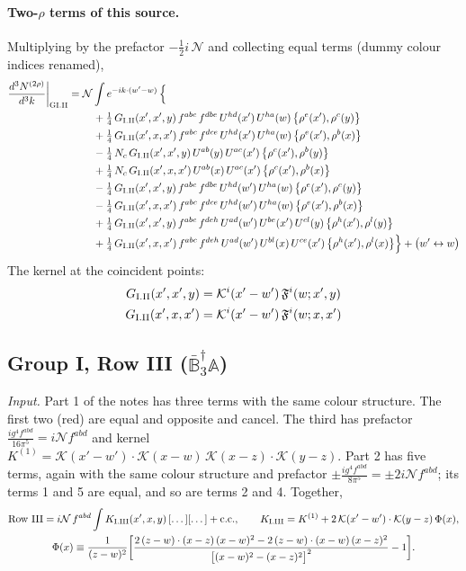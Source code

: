 \documentclass[10pt]{article}
\numberwithin{equation}{section}
\newcommand{\KK}{\mathcal K}
\newcommand{\NN}{\mathcal N}
\begin{document}
\paragraph{Two-$\rho$ terms of this source.} Multiplying by the prefactor $-\tfrac12i\,\NN$ and collecting equal terms (dummy colour indices renamed),
\begin{align}
\frac{d^3N^{(2\rho)}}{d^3k}\bigg|_{\rm GI.II}={}&\NN\int e^{-ik\cdot(w'-w)}\,\Big\{\notag\\
&\quad +\tfrac14\,G_{\rm I.II}(x',x',y)\,f^{abc}\,f^{dbe}\,U^{hd}(x')\,U^{ha}(w)\,\big\{\rho^{e}(x'),\rho^{c}(y)\big\}\notag\\
&\quad +\tfrac14\,G_{\rm I.II}(x',x,x')\,f^{abc}\,f^{dce}\,U^{hd}(x')\,U^{ha}(w)\,\big\{\rho^{e}(x'),\rho^{b}(x)\big\}\notag\\
&\quad -\tfrac14\,N_{c}\,G_{\rm I.II}(x',x',y)\,U^{ab}(y)\,U^{ac}(x')\,\big\{\rho^{c}(x'),\rho^{b}(y)\big\}\notag\\
&\quad +\tfrac14\,N_{c}\,G_{\rm I.II}(x',x,x')\,U^{ab}(x)\,U^{ac}(x')\,\big\{\rho^{c}(x'),\rho^{b}(x)\big\}\notag\\
&\quad -\tfrac14\,G_{\rm I.II}(x',x',y)\,f^{abc}\,f^{dbe}\,U^{hd}(w')\,U^{ha}(w)\,\big\{\rho^{e}(x'),\rho^{c}(y)\big\}\notag\\
&\quad -\tfrac14\,G_{\rm I.II}(x',x,x')\,f^{abc}\,f^{dce}\,U^{hd}(w')\,U^{ha}(w)\,\big\{\rho^{e}(x'),\rho^{b}(x)\big\}\notag\\
&\quad +\tfrac14\,G_{\rm I.II}(x',x',y)\,f^{abc}\,f^{deh}\,U^{ad}(w')\,U^{be}(x')\,U^{cl}(y)\,\big\{\rho^{h}(x'),\rho^{l}(y)\big\}\notag\\
&\quad +\tfrac14\,G_{\rm I.II}(x',x,x')\,f^{abc}\,f^{deh}\,U^{ad}(w')\,U^{bl}(x)\,U^{ce}(x')\,\big\{\rho^{h}(x'),\rho^{l}(x)\big\}\Big\}+\big(w'\leftrightarrow w\big)\label{eq:res-GI.II}
\end{align}
The kernel at the coincident points:
\begin{align*}
G_{\rm I.II}(x',x',y)&=\KK^{i}(x'-w')\,\mathfrak F^{i}(w;x',y)\\G_{\rm I.II}(x',x,x')&=\KK^{i}(x'-w')\,\mathfrak F^{i}(w;x,x')
\end{align*}
\subsection{Group I, Row III ($\bar{\mathbb B}_3^\dagger\mathbb A$)}\label{sec:GI.III}
\emph{Input.} Part 1 of the notes has three terms with the same colour structure. The first two (red) are equal and opposite and cancel. The third has prefactor $\frac{ig^4f^{abd}}{16\pi^5}=i\NN f^{abd}$ and kernel $K^{(1)}=\KK(x'-w')\cdot\KK(x-w)\,\KK(x-z)\cdot\KK(y-z)$. Part 2 has five terms, again with the same colour structure and prefactor $\pm\frac{ig^4f^{abd}}{8\pi^5}=\pm2i\NN f^{abd}$; its terms 1 and 5 are equal, and so are terms 2 and 4. Together,
\begin{gather*}
\text{Row III}=i\NN\,f^{abd}\int K_{\rm I.III}(x',x,y)\,[\dots][\dots]+{\rm c.c.},\qquad K_{\rm I.III}=K^{(1)}+2\,\KK(x'-w')\cdot\KK(y-z)\,\Phi(x),\\
\Phi(x)\equiv\frac{1}{(z-w)^2}\bigg[\frac{2\,(z-w)\cdot(x-z)\,(x-w)^2-2\,(z-w)\cdot(x-w)\,(x-z)^2}{\big[(x-w)^2-(x-z)^2\big]^2}-1\bigg].
\end{gather*}
\end{document}
